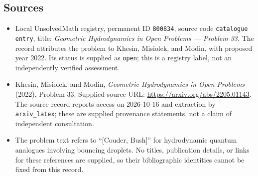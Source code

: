 \documentclass[11pt]{article}
\begin{document}
\subsection{Sources}
\begin{itemize}
\item Local UnsolvedMath registry, permanent ID \texttt{800834}, source code \texttt{catalogue entry}, title: \emph{Geometric Hydrodynamics in Open Problems --- Problem 33}. The record attributes the problem to Khesin, Misiolek, and Modin, with proposed year 2022. Its status is supplied as \texttt{open}; this is a registry label, not an independently verified assessment.
\item Khesin, Misiolek, and Modin, \emph{Geometric Hydrodynamics in Open Problems} (2022), Problem 33. Supplied source URL: \url{https://arxiv.org/abs/2205.01143}. The source record reports access on 2026-10-16 and extraction by \texttt{arxiv\_latex}; these are supplied provenance statements, not a claim of independent consultation.
\item The problem text refers to ``[Couder, Bush]'' for hydrodynamic quantum analogues involving bouncing droplets. No titles, publication details, or links for these references are supplied, so their bibliographic identities cannot be fixed from this record.
\end{itemize}
\end{document}
